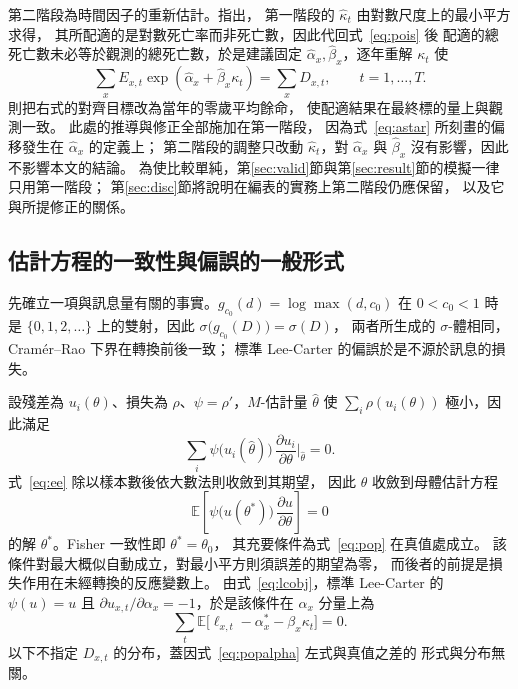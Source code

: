 \documentclass[UTF8, fontset=macnew, a4paper, 12pt]{ctexart}
\newcommand{\Ex}{\mathbb{E}}
\begin{document}
第二階段為時間因子的重新估計。\citet{lee1992}指出，
第一階段的 $\hat\kappa_t$ 由對數尺度上的最小平方求得，
其所配適的是對數死亡率而非死亡數，因此代回式~\eqref{eq:pois} 後
配適的總死亡數未必等於觀測的總死亡數，於是建議固定
$\hat\alpha_x,\hat\beta_x$，逐年重解 $\kappa_t$ 使
\begin{equation}\label{eq:stage2}
\sum_{x}E_{x,t}\exp(\hat\alpha_x+\hat\beta_x\kappa_t)=\sum_x D_{x,t},
\qquad t=1,\dots,T .
\end{equation}
\citet{leemiller2001}則把右式的對齊目標改為當年的零歲平均餘命，
使配適結果在最終標的量上與觀測一致。
此處的推導與修正全部施加在第一階段，
因為式~\eqref{eq:astar} 所刻畫的偏移發生在 $\hat\alpha_x$ 的定義上；
第二階段的調整只改動 $\hat\kappa_t$，對 $\hat\alpha_x$ 與 $\hat\beta_x$
沒有影響，因此不影響本文的結論。
為使比較單純，第\ref{sec:valid}節與第\ref{sec:result}節的模擬一律只用第一階段；
第\ref{sec:disc}節將說明在編表的實務上第二階段仍應保留，
以及它與所提修正的關係。

\subsection{估計方程的一致性與偏誤的一般形式}\label{subsec:consistency}\label{subsec:mixrep}

先確立一項與訊息量有關的事實。$g_{c_0}(d)=\log\max(d,c_0)$ 在 $0<c_0<1$ 時是
$\{0,1,2,\dots\}$ 上的雙射，因此 $\sigma\bigl(g_{c_0}(D)\bigr)=\sigma(D)$，
兩者所生成的 $\sigma$-體相同，Cramér--Rao 下界在轉換前後一致；
標準 Lee-Carter 的偏誤於是不源於訊息的損失。

設殘差為 $u_i(\theta)$、損失為 $\rho$、$\psi=\rho'$，$M$-估計量 $\hat\theta$
使 $\sum_i\rho(u_i(\theta))$ 極小，因此滿足
\begin{equation}\label{eq:ee}
\sum_i \psi\big(u_i(\hat\theta)\big)\,
\frac{\partial u_i}{\partial\theta}\Big|_{\hat\theta}=0 .
\end{equation}
式~\eqref{eq:ee} 除以樣本數後依大數法則收斂到其期望，
因此 $\hat\theta$ 收斂到母體估計方程
\begin{equation}\label{eq:pop}
\Ex\!\left[\psi\big(u(\theta^{\ast})\big)\,
\frac{\partial u}{\partial\theta}\right]=0
\end{equation}
的解 $\theta^{\ast}$。Fisher 一致性即 $\theta^{\ast}=\theta_0$，
其充要條件為式~\eqref{eq:pop} 在真值處成立。
該條件對最大概似自動成立，對最小平方則須誤差的期望為零，
而後者的前提是損失作用在未經轉換的反應變數上。
由式~\eqref{eq:lcobj}，標準 Lee-Carter 的 $\psi(u)=u$ 且
$\partial u_{x,t}/\partial\alpha_x=-1$，於是該條件在 $\alpha_x$ 分量上為
\begin{equation}\label{eq:popalpha}
\sum_{t}\Ex\big[\ell_{x,t}-\alpha_x^{\ast}-\beta_x\kappa_t\big]=0 .
\end{equation}
以下不指定 $D_{x,t}$ 的分布，蓋因式~\eqref{eq:popalpha} 左式與真值之差的
形式與分布無關。
\end{document}
